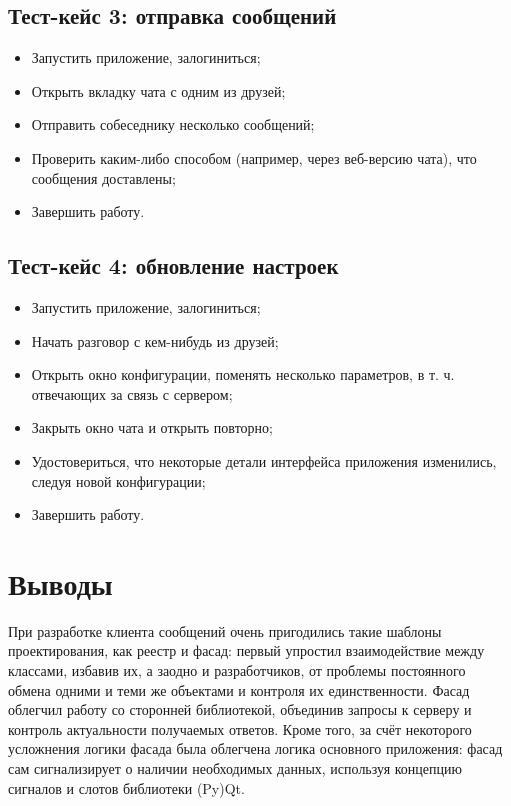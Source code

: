 \documentclass[12pt]{article}
\begin{document}
\subsection{Тест-кейс 3: отправка сообщений}
\begin{itemize}
\setlength{\itemsep}{-1mm}
\item Запустить приложение, залогиниться;
\item Открыть вкладку чата с одним из друзей;
\item Отправить собеседнику несколько сообщений;
\item Проверить каким-либо способом (например, через веб-версию чата), что сообщения доставлены;
\item Завершить работу.
\end{itemize}

\subsection{Тест-кейс 4: обновление настроек}
\begin{itemize}
\setlength{\itemsep}{-1mm}
\item Запустить приложение, залогиниться;
\item Начать разговор с кем-нибудь из друзей;
\item Открыть окно конфигурации, поменять несколько параметров, в т. ч. отвечающих за связь с сервером;
\item Закрыть окно чата и открыть повторно;
\item Удостовериться, что некоторые детали интерфейса приложения изменились, следуя новой конфигурации;
\item Завершить работу.
\end{itemize}



\newpage
\section{Выводы}
\indent При разработке клиента сообщений очень пригодились такие шаблоны проектирования, как реестр и фасад: первый упростил взаимодействие между классами, избавив их, а заодно и разработчиков, от проблемы постоянного обмена одними и теми же объектами и контроля их единственности. Фасад облегчил работу со сторонней библиотекой, объединив запросы к серверу и контроль актуальности получаемых ответов. Кроме того, за счёт некоторого усложнения логики фасада была облегчена логика основного приложения: фасад сам сигнализирует о наличии необходимых данных, используя концепцию сигналов и слотов библиотеки (Py)Qt. \newline
\end{document}
